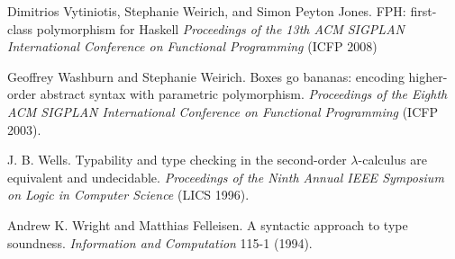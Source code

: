 \begin{thebibliography}{99}
Dimitrios Vytiniotis, Stephanie Weirich, and Simon Peyton Jones.
FPH: first-class polymorphism for Haskell
\emph{Proceedings of the 13th ACM SIGPLAN International
Conference on Functional Programming} (ICFP 2008)

Geoffrey Washburn and Stephanie Weirich.
Boxes go bananas: encoding higher-order abstract syntax with
parametric polymorphism.
\emph{Proceedings of the Eighth ACM SIGPLAN International
Conference on Functional Programming} (ICFP 2003).

J. B. Wells.
Typability and type checking in the second-order
$\lambda$-calculus are equivalent and undecidable.
\emph{Proceedings of the Ninth Annual IEEE Symposium on Logic in
Computer Science} (LICS 1996).

Andrew K. Wright and Matthias Felleisen.
A syntactic approach to type soundness.
\emph{Information and Computation} 115-1 (1994).
\end{thebibliography}
